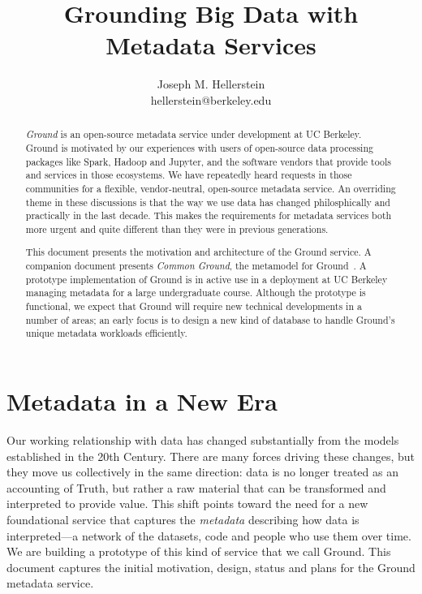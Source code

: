 \documentclass[10pt,letterpaper]{article}
\author{
Joseph M. Hellerstein\\
       {\scriptsize hellerstein@berkeley.edu}
}
\title{Grounding Big Data with Metadata Services}
\date{}
\newcommand{\jmh}[1]{{\textcolor{red}{#1---jmh}}}
\begin{document}
\maketitle

\begin{abstract}
\emph{Ground} is an open-source metadata service under development at UC Berkeley.  Ground is motivated by our experiences with users of open-source data processing packages like Spark, Hadoop and Jupyter, and the software vendors that provide tools and services in those ecosystems.  We have repeatedly heard requests in those communities for a flexible, vendor-neutral, open-source metadata service.  An overriding theme in these discussions is that the way we use data has changed philosphically and practically in the last decade.  This makes the requirements for metadata services both more urgent and quite different than they were in previous generations.

This document presents the motivation and architecture of the Ground service.  A companion document presents \emph{Common Ground}, the metamodel for Ground~\cite{commonground}.  A prototype implementation of Ground is in active use in a deployment at UC Berkeley managing metadata for a large undergraduate course.  Although the prototype is functional, we expect that Ground will require new technical developments in a number of areas; an early focus is to design a new kind of database to handle Ground's unique metadata workloads efficiently.
\end{abstract}


\section{Metadata in a New Era}
\label{sec:intro}
Our working relationship with data has changed substantially from the models established in the 20th Century.  There are many forces driving these changes, but they move us collectively in the same direction: data is no longer treated as an accounting of Truth, but rather a raw material that can be transformed and interpreted to provide value.  
This shift points toward the need for a new foundational service that captures the \emph{metadata} describing how data is interpreted---a network of the datasets, code and people who use them over time.  We are building a prototype of this kind of service that we call Ground.  This document captures the initial motivation, design, status and plans for the Ground metadata service.
\end{document}
